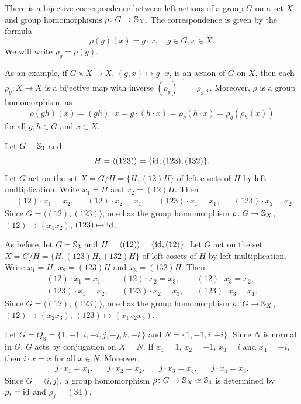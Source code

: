 There is a bijective correspondence between 
left actions of a group $G$ on a set $X$ and
group homomorphisms 
$\rho\colon G\to\mathbb{S}_X$. The correspondence is given by
the formula 
\[
\rho(g)(x)=g\cdot x,\quad g\in G,x\in X.
\]
We will write $\rho_g=\rho(g)$.

As an example, if $G\times X\to X$, $(g,x)\mapsto g\cdot x$, is 
an action of $G$ on $X$, then
each $\rho_g\colon X\to X$ is a bijective map with inverse 
$(\rho_g)^{-1}=\rho_{g^{-1}}$. Moreover, 
 $\rho$ is a group homomorphism, as 
\[
\rho(gh)(x)=(gh)\cdot x=g\cdot (h\cdot x)=\rho_g(h\cdot x)=\rho_g(\rho_h(x))
\]
for all $g,h\in G$ and $x\in X$.

\begin{example}
Let $G=\mathbb{S}_3$ and 
\[
H=\langle (123)\rangle=\{\operatorname{id},(123),(132)\}.
\]
Let $G$ act on the set $X=G/H=\{H,(12)H\}$ of left cosets of $H$ 
by left multiplication. Write 
$x_1=H$ and $x_2=(12)H$. Then
\begin{align*}
&(12)\cdot x_1=x_2,
&&(12)\cdot x_2=x_1,
&&(123)\cdot x_1=x_1,
&&(123)\cdot x_2=x_2.
\end{align*}
Since $G=\langle (12),(123)\rangle$, one has the group 
homomorphism 
$\rho\colon G\to\mathbb{S}_{X}$, 
$(12)\mapsto (x_1x_2)$, $(123)\mapsto\operatorname{id}$.
\end{example}

\begin{example}
As before, let $G=\mathbb{S}_3$ and $H=\langle (12)\rangle=\{\operatorname{id},(12)\}$. Let $G$ act on the set $X=G/H=\{H,(123
)H,(132)H\}$ of left cosets of $H$ by left multiplication. Write 
$x_1=H$, $x_2=(123)H$ and $x_3=(132)H$. Then
\begin{align*}
(12)\cdot x_1=x_1,&& (12)\cdot x_2=x_3, && (12)\cdot x_3=x_2,\\
(123)\cdot x_1=x_2, && (123)\cdot x_2=x_3, &&(123)\cdot x_3=x_1.
\end{align*}
Since $G=\langle (12),(123)\rangle$, one has the group
homomorphism 
$\rho\colon G\to\mathbb{S}_{X}$, $(12)\mapsto (x_2x_3)$, $(123)\mapsto (x_1x_2x_3)$.
\end{example}


\begin{example}
Let $G=Q_8=\{1,-1,i,-i,j,-j,k,-k\}$ and $N=\{1,-1,i,-i\}$. Since
$N$ is normal in $G$, $G$
acts by conjugation on $X=N$.
If $x_1=1$, $x_2=-1$, $x_3=i$ and $x_4=-i$, then
$i\cdot x=x$ for all $x\in N$. Moreover, 
\begin{align*}
j\cdot x_1=x_1, && j\cdot x_2=x_2, && j\cdot x_3=x_4, && j\cdot x_4=x_3.
\end{align*}
Since $G=\langle i,j\rangle$, a group homomorphism $\rho\colon G\to\mathbb{S}_X\simeq\mathbb{S}_4$ is determined by 
$\rho_i=\operatorname{id}$ and $\rho_j=(34)$.
\end{example}



